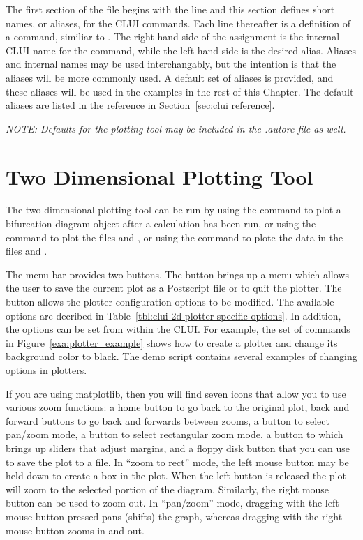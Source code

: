 \documentclass[12pt]{report}
\begin{document}
 The first section of the  file
 begins with the line 
 and this section defines short names, or aliases,
 for the \AUTO CLUI commands.  
 Each line thereafter is a definition of
 a command, similiar to 
 .
 The right hand side of the assignment
 is the internal \AUTO CLUI name for the command,
 while the left hand side is the desired alias.  
 Aliases and
 internal names may be used interchangably, but the
 intention is that the aliases will be more commonly
 used.  A default set of aliases is provided, and
 these aliases will be used in the examples in the
 rest of this Chapter.  The default aliases
 are listed in the reference in Section~\ref{sec:clui reference}.

 {\em NOTE:  Defaults for the plotting tool may be included in
 the .autorc file as well.}

 \section{ Two Dimensional Plotting Tool}\label{clui:2d plotting}

 The two dimensional plotting tool can be run by using the command
  to plot a bifurcation diagram object 
 after a calculation has been run, or using the command
  to plot the files  and ,
 or using the command  to plote the data in the
 files  and .  

 The menu bar provides two buttons.  The 
 button brings up a menu which allows the user to save
 the current plot as a Postscript file or
 to quit the plotter.
 The  button allows the plotter
 configuration options to be modified.
 The available options are decribed in
 Table~\ref{tbl:clui 2d plotter specific options}.  In addition, the options can 
 be set from within the CLUI.  For example,
 the set of commands in Figure~\ref{exa:plotter_example} shows how to
 create a plotter and change its background color to black.  The
 demo script  contains several
 examples of changing options in plotters.

 If you are using matplotlib, then you will find seven icons that allow
 you to use various zoom functions: a home button to go back to the
 original plot, back and forward buttons to go back and forwards
 between zooms, a button to select pan/zoom mode, a button to select
 rectangular zoom mode, a button to which brings up sliders that
 adjust margins, and a floppy disk button that you can use
 to save the plot to a file. 
 In ``zoom to rect'' mode, the left mouse button may be held down to create
 a box in the plot.  When the left button is released the plot will
 zoom to the selected portion of the diagram. Similarly, the right
 mouse button can be used to zoom out. In ``pan/zoom'' mode, dragging
 with the left mouse button pressed pans (shifts) the graph, whereas
 dragging with the right mouse button zooms in and out.
\end{document}

